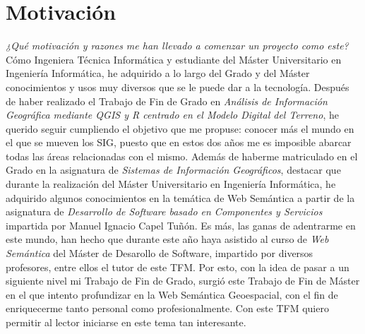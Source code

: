 

\section{Motivación}


\textit{¿Qué motivación y razones me han llevado a comenzar un proyecto como este?} Cómo Ingeniera Técnica Informática y estudiante del Máster Universitario en Ingeniería Informática, he adquirido a lo largo del Grado y del Máster conocimientos y usos muy diversos que se le puede dar a la tecnología. Después de haber realizado el Trabajo de Fin de Grado en \textit{Análisis de Información Geográfica mediante QGIS y R centrado en el Modelo Digital del Terreno}, he querido seguir cumpliendo el objetivo que me propuse: conocer más el mundo en el que se mueven los SIG, puesto que en estos dos años me es imposible abarcar todas las áreas relacionadas con el mismo. Además de haberme matriculado en el Grado en la asignatura de \textit{Sistemas de Información Geográficos}, destacar que durante la realización del Máster Universitario en Ingeniería Informática, he adquirido algunos conocimientos en la temática de Web Semántica a partir de la asignatura de \textit{Desarrollo de Software basado en Componentes y Servicios} impartida por Manuel Ignacio Capel Tuñón. Es más, las ganas de adentrarme en este mundo, han hecho que durante este año haya asistido al curso de \textit{Web Semántica} del Máster de Desarollo de Software, impartido por diversos profesores, entre ellos el tutor de este TFM. Por esto, con la idea de pasar a un siguiente nivel mi Trabajo de Fin de Grado, surgió este Trabajo de Fin de Máster en el que intento profundizar en la Web Semántica Geoespacial, con el fin de enriquecerme tanto personal como profesionalmente. Con este TFM quiero permitir al lector iniciarse en este tema tan interesante.\\ 

